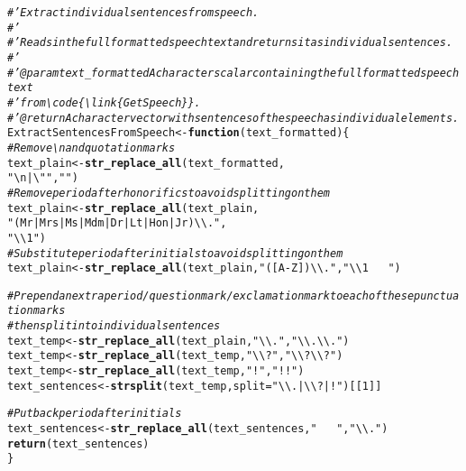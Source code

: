 \documentclass{article}\usepackage[]{graphicx}\usepackage[]{color}
\makeatletter
\newcommand{\hlnum}[1]{\textcolor[rgb]{0.686,0.059,0.569}{#1}}%
\newcommand{\hlstr}[1]{\textcolor[rgb]{0.192,0.494,0.8}{#1}}%
\newcommand{\hlcom}[1]{\textcolor[rgb]{0.678,0.584,0.686}{\textit{#1}}}%
\newcommand{\hlstd}[1]{\textcolor[rgb]{0.345,0.345,0.345}{#1}}%
\newcommand{\hlkwa}[1]{\textcolor[rgb]{0.161,0.373,0.58}{\textbf{#1}}}%
\newcommand{\hlkwb}[1]{\textcolor[rgb]{0.69,0.353,0.396}{#1}}%
\newcommand{\hlkwc}[1]{\textcolor[rgb]{0.333,0.667,0.333}{#1}}%
\newcommand{\hlkwd}[1]{\textcolor[rgb]{0.737,0.353,0.396}{\textbf{#1}}}%
\newenvironment{kframe}{%
 \def\at@end@of@kframe{}%
 \ifinner\ifhmode%
  \def\at@end@of@kframe{\end{minipage}}%
  \begin{minipage}{\columnwidth}%
 \fi\fi%
 \def\FrameCommand##1{\hskip\@totalleftmargin \hskip-\fboxsep
 \colorbox{shadecolor}{##1}\hskip-\fboxsep
     \hskip-\linewidth \hskip-\@totalleftmargin \hskip\columnwidth}%
 \MakeFramed {\advance\hsize-\width
   \@totalleftmargin\z@ \linewidth\hsize
   \@setminipage}}%
 {\par\unskip\endMakeFramed%
 \at@end@of@kframe}
\newenvironment{knitrout}{}{} %
\makeatother
\begin{document}
\begin{knitrout}
\begin{kframe}
\begin{alltt}
\hlcom{#' Extract individual sentences from speech.}
\hlcom{#' }
\hlcom{#' Reads in the full formatted speech text and returns it as individual sentences.}
\hlcom{#' }
\hlcom{#' @param text_formatted A character scalar containing the full formatted speech text }
\hlcom{#' from \textbackslash{}code\{\textbackslash{}link\{GetSpeech\}\}.}
\hlcom{#' @return A character vector with sentences of the speech as individual elements.}
\hlstd{ExtractSentencesFromSpeech} \hlkwb{<-} \hlkwa{function}\hlstd{(}\hlkwc{text_formatted}\hlstd{) \{}
  \hlcom{# Remove \textbackslash{}n and quotation marks}
  \hlstd{text_plain} \hlkwb{<-} \hlkwd{str_replace_all}\hlstd{(text_formatted,}
                                \hlstr{"\textbackslash{}n|\textbackslash{}""}\hlstd{,} \hlstr{""}\hlstd{)}
  \hlcom{# Remove period after honorifics to avoid splitting on them}
  \hlstd{text_plain} \hlkwb{<-} \hlkwd{str_replace_all}\hlstd{(text_plain,}
                                \hlstr{"(Mr|Mrs|Ms|Mdm|Dr|Lt|Hon|Jr)\textbackslash{}\textbackslash{}."}\hlstd{,}
                                \hlstr{"\textbackslash{}\textbackslash{}1"}\hlstd{)}
  \hlcom{# Substitute period after initials to avoid splitting on them}
  \hlstd{text_plain} \hlkwb{<-} \hlkwd{str_replace_all}\hlstd{(text_plain,} \hlstr{"([A-Z])\textbackslash{}\textbackslash{}."}\hlstd{,} \hlstr{"\textbackslash{}\textbackslash{}1~~~"}\hlstd{)}

  \hlcom{# Prepend an extra period/question mark/exclamation mark to each of these punctuation marks}
  \hlcom{# then split into individual sentences}
  \hlstd{text_temp} \hlkwb{<-} \hlkwd{str_replace_all}\hlstd{(text_plain,} \hlstr{"\textbackslash{}\textbackslash{}. "}\hlstd{,} \hlstr{"\textbackslash{}\textbackslash{}.\textbackslash{}\textbackslash{}. "}\hlstd{)}
  \hlstd{text_temp} \hlkwb{<-} \hlkwd{str_replace_all}\hlstd{(text_temp,} \hlstr{"\textbackslash{}\textbackslash{}? "}\hlstd{,} \hlstr{"\textbackslash{}\textbackslash{}?\textbackslash{}\textbackslash{}? "}\hlstd{)}
  \hlstd{text_temp} \hlkwb{<-} \hlkwd{str_replace_all}\hlstd{(text_temp,} \hlstr{"! "}\hlstd{,} \hlstr{"!! "}\hlstd{)}
  \hlstd{text_sentences} \hlkwb{<-} \hlkwd{strsplit}\hlstd{(text_temp,} \hlkwc{split} \hlstd{=} \hlstr{"\textbackslash{}\textbackslash{}. |\textbackslash{}\textbackslash{}? |! "}\hlstd{)[[}\hlnum{1}\hlstd{]]}

  \hlcom{# Put back period after initials}
  \hlstd{text_sentences} \hlkwb{<-} \hlkwd{str_replace_all}\hlstd{(text_sentences,} \hlstr{"~~~"}\hlstd{,} \hlstr{"\textbackslash{}\textbackslash{}."}\hlstd{)}
  \hlkwd{return}\hlstd{(text_sentences)}
\hlstd{\}}


\end{alltt}
\end{kframe}
\end{knitrout}
\end{document}
